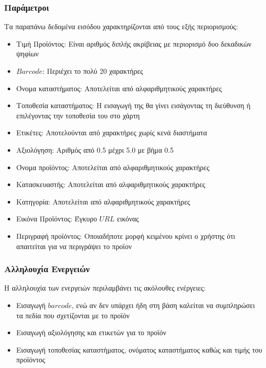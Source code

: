 \documentclass[12pt]{article}
\begin{document}
\subsubsection{Παράμετροι}

Τα παραπάνω δεδομένα εισόδου χαρακτηρίζονται από τους εξής περιορισμούς:

\begin{itemize}

\item Τιμή Προϊόντος: Είναι αριθμός διπλής ακρίβειας με περιορισμό δυο δεκαδικών ψηφίων

\item $Barcode$: Περιέχει το πολύ 20 χαρακτήρες

\item Όνομα καταστήματος: Αποτελείται από αλφαριθμητικούς χαρακτήρες

\item Τοποθεσία καταστήματος: Η εισαγωγή της θα γίνει εισάγοντας τη διεύθυνση ή επιλέγοντας την τοποθεσία του στο χάρτη

\item Ετικέτες: Αποτελούνται από χαρακτήρες χωρίς κενά διαστήματα

\item Αξιολόγηση: Aριθμός από 0.5 μέχρι 5.0 με βήμα 0.5

\item Όνομα προϊόντος: Aποτελείται από αλφαριθμητικούς χαρακτήρες

\item Κατασκευαστής: Aποτελείται από αλφαριθμητικούς χαρακτήρες

\item Κατηγορία: Aποτελείται από αλφαριθμητικούς χαρακτήρες

\item Εικόνα Προϊόντος: Έγκυρο $URL$ εικόνας
\item Περιγραφή προϊόντος: Οποιαδήποτε μορφή κειμένου κρίνει ο χρήστης ότι απαιτείται για να περιγράψει το προϊον
\end{itemize}

\subsubsection{Αλληλουχία Ενεργειών}

Η αλληλουχία των ενεργειών περιλαμβάνει τις ακόλουθες ενέργειες:

\begin{itemize}
\item Εισαγωγή $barcode$, ενώ αν δεν υπάρχει ήδη στη βάση καλείται να συμπληρώσει τα πεδία που σχετίζονται με το προϊόν
\item Εισαγωγή αξιολόγησης και ετικετών για το προϊόν
\item Εισαγωγή τοποθεσίας καταστήματος, ονόματος καταστήματος καθώς και τιμής του προϊόντος
\end{itemize}
\end{document}
